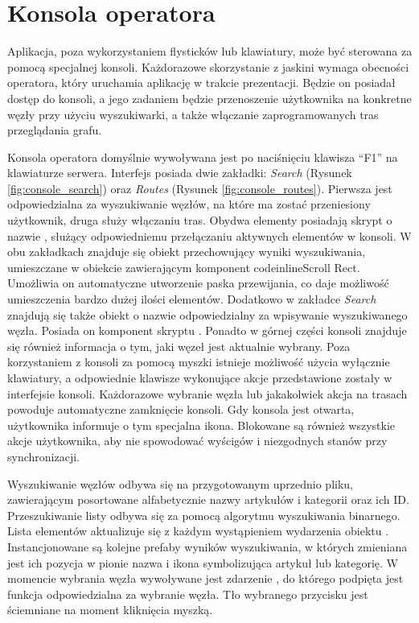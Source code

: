 \section{Konsola operatora}
\label{sec:konsola_operatora}
Aplikacja, poza wykorzystaniem flysticków lub klawiatury, może być sterowana za pomocą specjalnej konsoli. Każdorazowe skorzystanie z jaskini wymaga obecności operatora, który uruchamia aplikację w trakcie prezentacji. Będzie on posiadał dostęp do konsoli, a jego zadaniem będzie przenoszenie użytkownika na konkretne węzły przy użyciu wyszukiwarki, a także włączanie zaprogramowanych tras przeglądania grafu. 

Konsola operatora domyślnie wywoływana jest po naciśnięciu klawisza ``F1'' na klawiaturze serwera. Interfejs posiada dwie zakładki: \textit{Search} (Rysunek \ref{fig:console_search}) oraz \textit{Routes} (Rysunek \ref{fig:console_routes}). Pierwsza jest odpowiedzialna za wyszukiwanie węzłów, na które ma zostać przeniesiony użytkownik, druga służy włączaniu tras. Obydwa elementy posiadają skrypt o nazwie , służący odpowiedniemu przełączaniu aktywnych elementów w konsoli. W obu zakładkach znajduje się obiekt przechowujący wyniki wyszukiwania, umieszczane w obiekcie zawierającym komponent codeinline{Scroll Rect}. Umożliwia on automatyczne utworzenie paska przewijania, co daje możliwość umieszczenia bardzo dużej ilości elementów. Dodatkowo w zakładce \textit{Search} znajdują się także obiekt o nazwie  odpowiedzialny za wpisywanie wyszukiwanego węzła. Posiada on komponent skryptu . Ponadto w górnej części konsoli znajduje się również informacja o tym, jaki węzeł jest aktualnie wybrany. Poza korzystaniem z konsoli za pomocą myszki istnieje możliwość użycia wyłącznie klawiatury, a odpowiednie klawisze wykonujące akcje przedstawione zostały w interfejsie konsoli. Każdorazowe wybranie węzła lub jakakolwiek akcja na trasach powoduje automatyczne zamknięcie konsoli. Gdy konsola jest otwarta, użytkownika informuje o tym specjalna ikona. Blokowane są również wszystkie akcje użytkownika, aby nie spowodować wyścigów i niezgodnych stanów przy synchronizacji.


Wyszukiwanie węzłów odbywa się na przygotowanym uprzednio pliku, zawierającym posortowane alfabetycznie nazwy artykułów i kategorii oraz ich ID. Przeszukiwanie listy odbywa się za pomocą algorytmu wyszukiwania binarnego. Lista elementów aktualizuje się z każdym wystąpieniem wydarzenia  obiektu . Instancjonowane są kolejne prefaby wyników wyszukiwania, w których zmieniana jest ich pozycja w pionie nazwa i ikona symbolizująca artykuł lub kategorię. W momencie wybrania węzła wywoływane jest zdarzenie , do którego podpięta jest funkcja  odpowiedzialna za wybranie węzła. Tło wybranego przycisku jest ściemniane na moment kliknięcia myszką.


